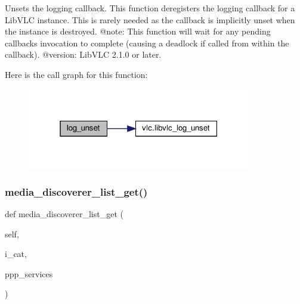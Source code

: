 \begin{DoxyVerb}Unsets the logging callback.
This function deregisters the logging callback for a LibVLC instance.
This is rarely needed as the callback is implicitly unset when the instance
is destroyed.
@note: This function will wait for any pending callbacks invocation to
complete (causing a deadlock if called from within the callback).
@version: LibVLC 2.1.0 or later.
\end{DoxyVerb}
 Here is the call graph for this function\+:
\nopagebreak
\begin{figure}[H]
\begin{center}
\leavevmode
\includegraphics[width=277pt]{classvlc_1_1_instance_a7785fcbfc657f19465b52c9130d8df63_cgraph}
\end{center}
\end{figure}
\mbox{\label{classvlc_1_1_instance_aa4bc2bb5925ba99e5946cb8daa03492e}} 
\subsubsection{\texorpdfstring{media\+\_\+discoverer\+\_\+list\+\_\+get()}{media\_discoverer\_list\_get()}}
{\footnotesize\ttfamily def media\+\_\+discoverer\+\_\+list\+\_\+get (\begin{DoxyParamCaption}\item[{}]{self,  }\item[{}]{i\+\_\+cat,  }\item[{}]{ppp\+\_\+services }\end{DoxyParamCaption})}

